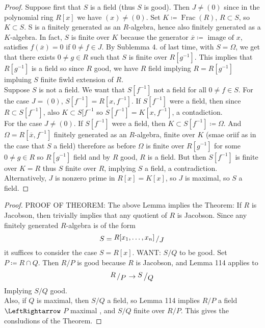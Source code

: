 \documentclass[12pt]{article}
\DeclareMathOperator{\Frac}{Frac}
\newcommand{\bigslant}[2]{{\raisebox{.2em}{$#1$}\left/\raisebox{-.2em}{$#2$}\right.}}
\theoremstyle{definition}
\begin{document}
\begin{proof}
Suppose first that $S$ is a field (thus $S$ is good). Then $J \neq (0)$ since in the polynomial ring $R[x]$ we have $(x) \neq (0)$. Set $K \coloneqq \Frac(R)$, $R\subset S$, so $K \subset S$. S is a finitely generated as an $R$-algebra, hence also finitely generated as a $K$-algebra. In fact, $S$ is finite over $K$ because the generator $\overline{x} \coloneqq \text{ image of }x$, satisfies $f(\overline{x}) = 0$ if $0\neq f \in J$. By Sublemma 4. of last time, with $S = \Omega$, we get that there exists $0 \neq g \in R$ such that $S$ is finite over $R[g^{-1}]$. This implies that $R[g^{-1}]$ is a field so since $R$ good, we have $R$ field implying $R = R[g^{-1}]$ impluing $S$ finite fiwld extension of $R$.\\

Suppose $S$ is not a field. We want that $S[f^{-1}]$ not a field for all $0\neq f \in S$. For the case $J = (0)$, $S[f^{-1}] = R[x,f^{-1}]$. If $S[f^{-1}]$ were a field, then since $R\subset S[f^{-1}]$, also $K\subset S[f^{-1}$ so $S[f^{-1}] = K[x, f^{-1}]$, a contadiction.\\
For the case $J\neq (0)$. If $S[f^{-1}]$ were a field, then $K \subset S[f^{-1}] \coloneqq \Omega$. And $\Omega = R[\overline{x}, f^{-1}]$ finitely generated as an $R$-algebra, finite over $K$ (smae oriif as in the case that $S$ a field) therefore as before $\Omega $ is finite over $R[g^{-1}]$ for some $0\neq g\in R$ so $R[g^{-1}]$ field and by $R $ good, $R$ is a field. But then $S[f^{-1}]$ is finite over $K = R$ thus $S$ finite over $R$, implying $S$ a field, a contradiction. Alternatively, $J$ is nonzero prime in $R[x]=K[x]$, so $J$ is maximal, so $S$ a field.
\end{proof}
\begin{proof}
PROOF OF THEOREM:
The above Lemma implies the Theorem: If $R$ is Jacobson, then trivially implies that any quotient of $R$ is Jacobson. Since any finitely generated $R$-algebra is of the form
\[
S = \bigslant{R[x_1,\dots, x_n]}{J}
\]
it suffices to consider the case $S=R[x]$. WANT: $S/Q$ to be good. Set $P \coloneqq R \cap Q$. Then $R/P$ is good because $R$ is Jacobson, and Lemma 114 applies to 
\[
\bigslant{R}{P} \rightarrow \bigslant{S}{Q}
\]
Implying $S/Q$ good.\\
Also, if $Q$ is maximal, then $S/Q$ a field, so Lemma 114 implies $R/P$ a field $\LeftRightarrow$ $P$ maximal , and $S/Q$ finite over $R/P$. This gives the consludions of the Theorem.
\end{proof}
\end{document}
